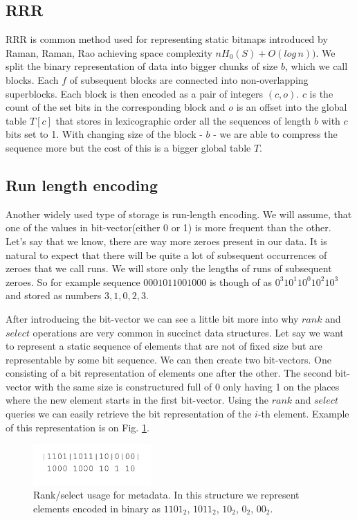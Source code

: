 \subsection{RRR}

RRR is common method used for representing static bitmaps introduced by Raman, Raman, Rao \cite{raman2007succinct} achieving space complexity $nH_0(S) + O(log\,n))$. We split the binary representation of data into bigger chunks of size $b$, which we call blocks.
Each $f$ of subsequent blocks are connected into non-overlapping superblocks. Each block is then encoded as a pair of integers $(c, o)$. $c$
is the count of the set bits in the corresponding block and $o$ is an offset into the global table $T[c]$ that stores in lexicographic order all the sequences of
length $b$ with $c$ bits set to 1. With changing size of the block - $b$ - we are able to compress the sequence more but the cost of this is a bigger global table $T$.

\subsection{Run length encoding}

Another widely used type of storage is run-length encoding. We will assume, that one of the values in bit-vector(either 0 or 1) is more frequent than the other. Let's say that we know, there are way more zeroes present in our data. It is natural to expect that there will be quite a lot of subsequent occurrences of zeroes that we call runs. We will store only the lengths of runs of subsequent zeroes. So for example
sequence $0001011001000$ is though of as $0^{3}10^{1}10^{0}10^{2}10^{3}$ and stored as numbers $3, 1, 0, 2, 3$.

After introducing the bit-vector we can see a little bit more into why $rank$ and $select$ operations are very common in succinct data structures. Let say we want to represent a static sequence of elements that are not of fixed size but are representable by some bit sequence.
We can then create two bit-vectors. One consisting of a bit representation of elements one after the other.
The second bit-vector with the same size is constructured full of 0 only having 1 on the places where the new element starts in the first bit-vector.
Using the $rank$ and $select$ queries we can easily retrieve the bit representation of the $i$-th element.
Example of this representation is on Fig. \ref{obr:obr_rank_select}.

\begin{figure}
\centerline{\includegraphics[width=0.4\textwidth]{images/obr_rank_select}}
\caption[Rank select usage in representation of sequence of elements with different size]{Rank/select usage for metadata. In this structure we represent elements encoded in binary as $1101_2$, $1011_2$, $10_2$, $0_2$, $00_2$.}
\label{obr:obr_rank_select}
\end{figure}

